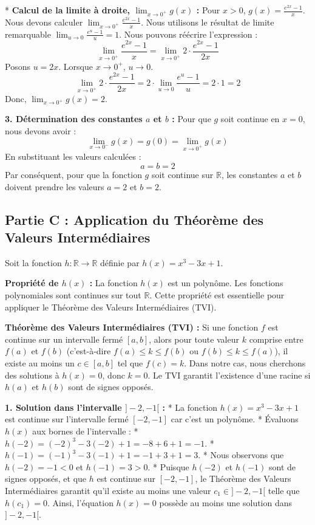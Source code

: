 \documentclass[12pt,a4paper]{report}
\begin{document}
*   \textbf{Calcul de la limite à droite, $\lim_{x \to 0^+} g(x)$ :}
    Pour $x > 0$, $g(x) = \frac{e^{2x}-1}{x}$.
    Nous devons calculer $\lim_{x \to 0^+} \frac{e^{2x}-1}{x}$.
    Nous utilisons le résultat de limite remarquable $\lim_{u \to 0} \frac{e^u-1}{u} = 1$.
    Nous pouvons réécrire l'expression :
    $$ \lim_{x \to 0^+} \frac{e^{2x}-1}{x} = \lim_{x \to 0^+} 2 \cdot \frac{e^{2x}-1}{2x} $$
    Posons $u = 2x$. Lorsque $x \to 0^+$, $u \to 0$.
    $$ \lim_{x \to 0^+} 2 \cdot \frac{e^{2x}-1}{2x} = 2 \cdot \lim_{u \to 0} \frac{e^u-1}{u} = 2 \cdot 1 = 2 $$
    Donc, $\lim_{x \to 0^+} g(x) = 2$.

\textbf{3. Détermination des constantes $a$ et $b$ :}
Pour que $g$ soit continue en $x=0$, nous devons avoir :
$$ \lim_{x \to 0^-} g(x) = g(0) = \lim_{x \to 0^+} g(x) $$
En substituant les valeurs calculées :
$$ a = b = 2 $$
Par conséquent, pour que la fonction $g$ soit continue sur $\mathbb{R}$, les constantes $a$ et $b$ doivent prendre les valeurs $a=2$ et $b=2$.

\subsection{Partie C : Application du Théorème des Valeurs Intermédiaires}

Soit la fonction $h: \mathbb{R} \to \mathbb{R}$ définie par $h(x) = x^3 - 3x + 1$.

\textbf{Propriété de $h(x)$ :}
La fonction $h(x)$ est un polynôme. Les fonctions polynomiales sont continues sur tout $\mathbb{R}$. Cette propriété est essentielle pour appliquer le Théorème des Valeurs Intermédiaires (TVI).

\textbf{Théorème des Valeurs Intermédiaires (TVI) :}
Si une fonction $f$ est continue sur un intervalle fermé $[a, b]$, alors pour toute valeur $k$ comprise entre $f(a)$ et $f(b)$ (c'est-à-dire $f(a) \le k \le f(b)$ ou $f(b) \le k \le f(a)$), il existe au moins un $c \in [a, b]$ tel que $f(c) = k$.
Dans notre cas, nous cherchons des solutions à $h(x)=0$, donc $k=0$. Le TVI garantit l'existence d'une racine si $h(a)$ et $h(b)$ sont de signes opposés.

\textbf{1. Solution dans l'intervalle $]-2, -1[$ :}
*   La fonction $h(x) = x^3 - 3x + 1$ est continue sur l'intervalle fermé $[-2, -1]$ car c'est un polynôme.
*   Évaluons $h(x)$ aux bornes de l'intervalle :
    *   $h(-2) = (-2)^3 - 3(-2) + 1 = -8 + 6 + 1 = -1$.
    *   $h(-1) = (-1)^3 - 3(-1) + 1 = -1 + 3 + 1 = 3$.
*   Nous observons que $h(-2) = -1 < 0$ et $h(-1) = 3 > 0$.
*   Puisque $h(-2)$ et $h(-1)$ sont de signes opposés, et que $h$ est continue sur $[-2, -1]$, le Théorème des Valeurs Intermédiaires garantit qu'il existe au moins une valeur $c_1 \in ]-2, -1[$ telle que $h(c_1) = 0$.
    Ainsi, l'équation $h(x)=0$ possède au moins une solution dans $]-2, -1[$.
\end{document}
